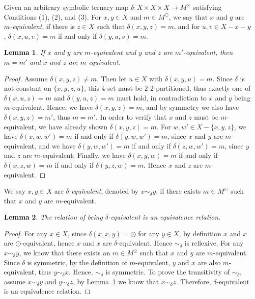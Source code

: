 \documentclass{article}
\newtheorem{lemma}{Lemma}
\begin{document}
Given an arbitrary symbolic ternary map  $\delta: X\times X\times X\to M^\odot$ satisfying 
Conditions (1), (2), and (3).
For $x,y \in X$ and $m\in  M^{\odot}$, we say that $x$ and $y$ are {\em $m$-equivalent}, 
if there is $z \in X$ such that $\delta(x,y,z)=m$, and for $u,v \in X-x-y$, $\delta (x,u,v)=m$ if and only if 
$\delta (y,u,v)=m$. 
\begin{lemma} \label{lem:transitive}
If $x$ and $y$ are $m$-equivalent and $y$ and $z$ are $m'$-equivalent, then $m=m'$ and $x$ and $z$ are 
$m$-equivalent. 
\end{lemma} 
\begin{proof}
Assume $\delta(x,y,z) \neq m$. Then let $u \in X$ with $\delta(x,y,u)=m$. Since $\delta$ is not constant on 
$\{x,y,z,u\}$, this 4-set must be 2-2-partitioned, thus exactly one of $\delta(x,u,z)=m$ and $\delta(y,u,z)=m$ 
must hold, in contradiction to $x$ and $y$ being $m$-equivalent. Hence, we have $\delta(x,y,z) = m$, and 
by symmetry we also have $\delta(x,y,z) = m'$, thus $m=m'$. In order to verify that  $x$ and $z$ must be 
$m$-equivalent, we have already shown $\delta(x,y,z) = m$. For $w,w' \in X-\{x,y,z\}$, we have
$\delta(x,w,w')=m$ if and only if $\delta(y,w,w')=m$, since $x$ and $y$ are $m$-equivalent, and we have 
$\delta(y,w,w')=m$ if and only if $\delta(z,w,w')=m$, since $y$ and $z$ are $m$-equivalent. 
Finally, we have $\delta(x,y,w)=m$ if and only if $\delta(x,z,w)=m$ if and only if $\delta(y,z,w)=m$. 
Hence $x$ and $z$ are $m$-equivalent. 
\end{proof}

We say $x,y\in X$ are {\em $\delta$-equivalent}, denoted by {\em $x\sim_{\delta} y$}, if there exists 
$m\in M^\odot$
such that $x$ and $y$ are $m$-equivalent.

\begin{lemma}
 The relation of being $\delta$-equivalent is an equivalence relation.
\end{lemma}

\begin{proof}
 For any $x\in X$, since $\delta(x,x,y)=\odot$ for any $y\in X$, by definition $x$ and $x$ are $\odot$-equivalent,
 hence $x$ and $x$ are $\delta$-equivalent. Hence $\sim_{\delta}$ is reflexive. For any $x\sim_{\delta} y$, we know that there exists an $m\in M^{\odot}$
 such that $x$ and $y$ are $m$-equivalent. Since $\delta$ is symmetric, by the definition of $m$-equivalent, $y$ and $x$
 are also $m$-equivalent, thus $y\sim_{\delta} x$. Hence, $\sim_{\delta}$ is symmetric.
 To prove the transitivity of $\sim_{\delta}$, assume $x\sim_{\delta} y$ and $y\sim_{\delta} z$, by Lemma~\ref{lem:transitive}
 we know that $x\sim_{\delta} z$. Therefore, $\delta$-equivalent is an equivalence relation.
\end{proof}
\end{document}
